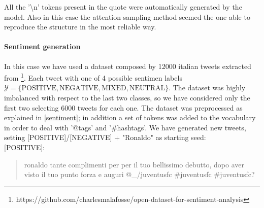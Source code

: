 \documentclass[10pt,twocolumn,letterpaper]{article}
\begin{document}
%
%
%
%

All the '\textbackslash n' tokens present in the quote were automatically generated by the model.
Also in this case the attention sampling method seemed the one able to reproduce the structure in the most reliable way.


\paragraph{Sentiment generation} In this case we have used a dataset
composed by 12000 italian tweets extracted from
\footnote[1]{https://github.com/charlesmalafosse/open-dataset-for-sentiment-analysis}.
Each tweet with one of 4 possible sentimen labels
$\mathcal Y = \{\text{POSITIVE}, \text{NEGATIVE}, \text{MIXED}, \text{NEUTRAL}\}$.
The dataset was highly imbalanced with respect to the last two classes, so we have considered only the first two
selecting 6000 tweets for each one.
The dataset was preprocessed as explained in \ref{sentiment}; in addition a set of tokens was added to the vocabulary
in order to deal with '@tags' and '#hashtags'. We have generated new tweets, setting [POSITIVE]/[NEGATIVE] + "Ronaldo"
as starting seed:\\

[POSITIVE]:
\begin{quote}
   ronaldo tante complimenti per per il tuo bellissimo debutto, dopo aver visto il tuo punto forza e auguri @\_/juventusfc #juventusfc #juventusfc?
\end{quote}
\end{document}

